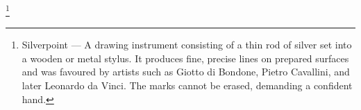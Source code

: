 \footnote{Silverpoint — A drawing instrument consisting of a thin rod of silver set into a wooden or metal stylus. It produces fine, precise lines on prepared surfaces and was favoured by artists such as Giotto di Bondone, Pietro Cavallini, and later Leonardo da Vinci. The marks cannot be erased, demanding a confident hand.}